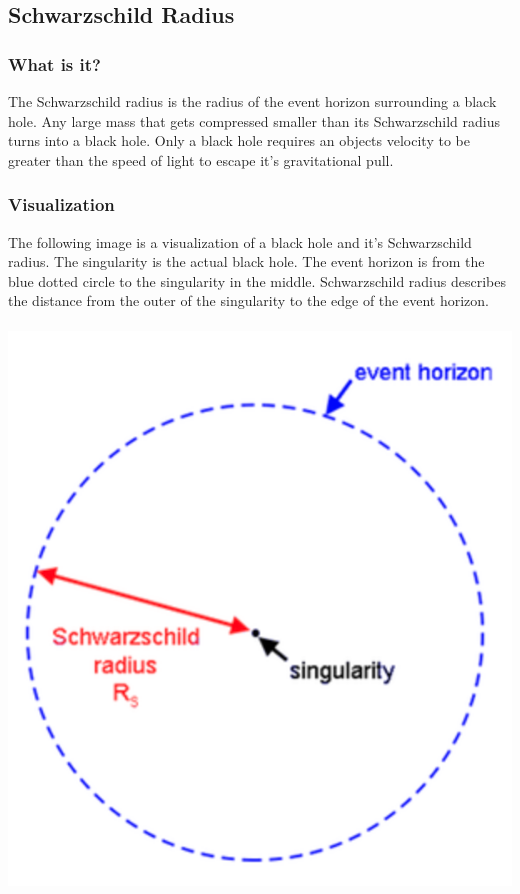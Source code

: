 \documentclass{article}
\begin{document}
\subsection{Schwarzschild Radius}
\subsubsection{What is it?}
The Schwarzschild radius is the radius of the event horizon surrounding a black hole. Any large mass that gets compressed smaller than its Schwarzschild radius turns into a black hole. Only a black hole requires an objects velocity to be greater than the speed of light to escape it's gravitational pull.

\subsubsection{Visualization}
The following image is a visualization of a black hole and it's Schwarzschild radius. The singularity is the actual black hole. The event horizon is from the blue dotted circle to the singularity in the middle. Schwarzschild radius describes the distance from the outer of the singularity to the edge of the event horizon.\\\\
\includegraphics[scale=0.4]{images/schwarzschild_radius.png}
\end{document}
